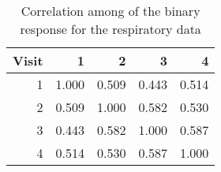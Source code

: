 \documentclass[12pt]{article}
\begin{document}
\begin{table}[h]
\begin{center}
\begin{tabular}{r | llll}
Visit & \multicolumn{1}{r}{1} & \multicolumn{1}{r}{2} &
    \multicolumn{1}{r}{3} & \multicolumn{1}{r}{4} \\ \hline
1 & 1.000 & 0.509 & 0.443 & 0.514 \\
2 & 0.509 & 1.000 & 0.582 & 0.530 \\
3 & 0.443 & 0.582 & 1.000 & 0.587 \\
4 & 0.514 & 0.530 & 0.587 & 1.000 \\
\end{tabular}
\end{center}
\caption{Correlation among of the binary response for the respiratory data}
\label{cor}
\end{table}
\end{document}

